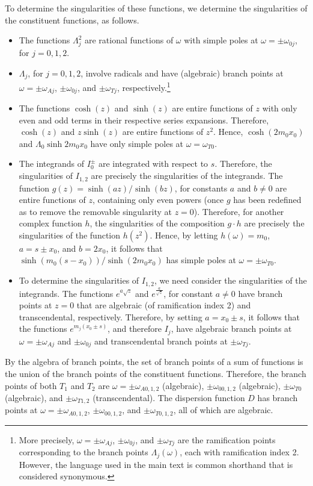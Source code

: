 \documentclass[12pt, draft]{../style-files/ociamthesis}
\begin{document}
To determine the singularities of these functions, we determine the singularities of the constituent functions, as follows.
\begin{itemize}
	\item The functions $\Lambda_j^2$ are rational functions of $\omega$ with simple poles at $\omega = \pm \omega_{0j}$, for $j = 0, 1, 2$.
	
	\item $\Lambda_j$, for $j = 0, 1, 2$, involve radicals and have (algebraic) branch points at $\omega = \pm \omega_{Aj}$, $\pm \omega_{0j}$, and $\pm \omega_{Tj}$, respectively.\footnote{More precisely, $\omega = \pm \omega_{Aj}$, $\pm \omega_{0j}$, and $\pm \omega_{Tj}$ are the ramification points corresponding to the branch points $\Lambda_j(\omega)$, each with ramification index 2. However, the language used in the main text is common shorthand that is considered synonymous.}
	
	\item The functions $\cosh(z)$ and $\sinh(z)$ are entire functions of $z$ with only even and odd terms in their respective series expansions. Therefore, $\cosh(z)$ and $z\sinh(z)$ are entire functions of $z^2$. Hence, $\cosh(2m_0x_0)$ and $\Lambda_0\sinh{2m_0x_0}$ have only simple poles at $\omega = \omega_{T0}$.
	
	\item The integrands of $I_0^\pm$ are integrated with respect to $s$. Therefore, the singularities of $I_{1,2}$ are precisely the singularities of the integrands. The function $g(z) = \sinh(az) / \sinh(bz)$, for constants $a$ and $b \neq 0$ are entire functions of $z$, containing only even powers (once $g$ has been redefined as to remove the removable singularity at $z = 0$). Therefore, for another complex function $h$, the singularities of the composition $g \cdot h$ are precisely the singularities of the function $h(z^2)$. Hence, by letting $h(\omega) = m_0$, $a = s \pm x_0$, and $b = 2x_0$, it follows that $\sinh(m_0(s - x_0)) / \sinh(2m_0x_0)$ has simple poles at $\omega = \pm \omega_{T0}$.
	
	\item To determine the singularities of $I_{1,2}$, we need consider the singularities of the integrands. The functions $e^{a\sqrt{z}}$ and $e^{\frac{a}{\sqrt{z}}}$, for constant $a \neq 0$ have branch points at $z = 0$ that are algebraic (of ramification index 2) and transcendental, respectively. Therefore, by setting $a = x_0 \pm s$, it follows that the functions $e^{m_j(x_0 \pm s)}$, and therefore $I_j$, have algebraic branch points at $\omega = \pm \omega_{Aj}$ and $\pm \omega_{0j}$ and transcendental branch points at $\pm \omega_{Tj}$.
\end{itemize}
By the algebra of branch points, the set of branch points of a sum of functions is the union of the branch points of the constituent functions. Therefore, the branch points of both $T_1$ and $T_2$ are $\omega = \pm \omega_{A0,1,2}$ (algebraic), $\pm \omega_{00,1,2}$ (algebraic), $\pm \omega_{T0}$ (algebraic), and $\pm \omega_{T1,2}$ (transcendental). The dispersion function $D$ has branch points at $\omega = \pm \omega_{A0,1,2}$, $\pm \omega_{00,1,2}$, and $\pm \omega_{T0,1,2}$, all of which are algebraic.
\end{document}
